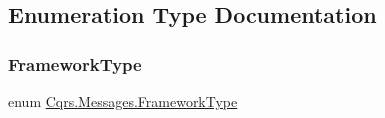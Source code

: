 \subsection{Enumeration Type Documentation}
\mbox{\label{namespaceCqrs_1_1Messages_af06a7e6cd2609043d0f2f5f3419f81e3_af06a7e6cd2609043d0f2f5f3419f81e3}} 
\subsubsection{\texorpdfstring{Framework\+Type}{FrameworkType}}
{\footnotesize\ttfamily enum \hyperlink{namespaceCqrs_1_1Messages_af06a7e6cd2609043d0f2f5f3419f81e3_af06a7e6cd2609043d0f2f5f3419f81e3}{Cqrs.\+Messages.\+Framework\+Type}\hspace{0.3cm}{\ttfamily [strong]}}

